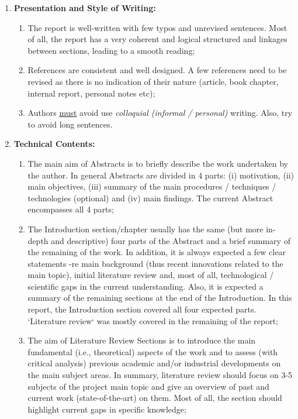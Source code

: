 \documentclass[14pt,twoside]{report}
\begin{document}
\begin{enumerate}
%
    \item {\bf Presentation and Style of Writing:}
                \begin{enumerate}
                   \item The report is well-written with few typos and unrevised sentences. Most of all, the report has a very coherent and logical structured and linkages between sections, leading to a smooth reading;
                   \item References are consistent and well designed. A few references need to be revised as there is no indication of their nature (article, book chapter, internal report, personal notes etc); 
                   \item Authors \underline{must} avoid use {\it colloquial (informal / personal)} writing. Also, try to avoid long sentences.
                \end{enumerate}
%
    \item {\bf Technical Contents:}
                \begin{enumerate}
                   \item The main aim of Abstracts is to briefly describe the work undertaken by the author. In general Abstracts are divided in 4 parts: (i) motivation, (ii) main objectives, (iii) summary of the main procedures / techniques / technologies (optional) and (iv) main findings. The current Abstract encompasses all 4 parts;
                   \item The Introduction section/chapter usually has the same (but more in-depth and descriptive) four parts of the Abstract and a brief summary of the remaining of the work. In addition, it is always expected a few clear statements -re main background (thus recent innovations related to the main topic), initial literature review and, most of all, technological / scientific gaps in the current understanding. Also, it is expected a summary of the remaining sections at the end of the Introduction. In this report, the Introduction section covered all four expected parts. `Literature review` was mostly covered in the remaining of the report; 
                   \item The aim of Literature Review Sections is to introduce the main fundamental (i.e., theoretical) aspects of the work and to assess (with critical analysis) previous academic and/or industrial developments on the main subject areas. In summary, literature review should focus on 3-5 subjects of the project main topic and give an overview of past and current work (state-of-the-art) on them. Most of all, the section should highlight current gaps in specific knowledge;
                     

\end{enumerate}
\end{enumerate}
\end{document}
